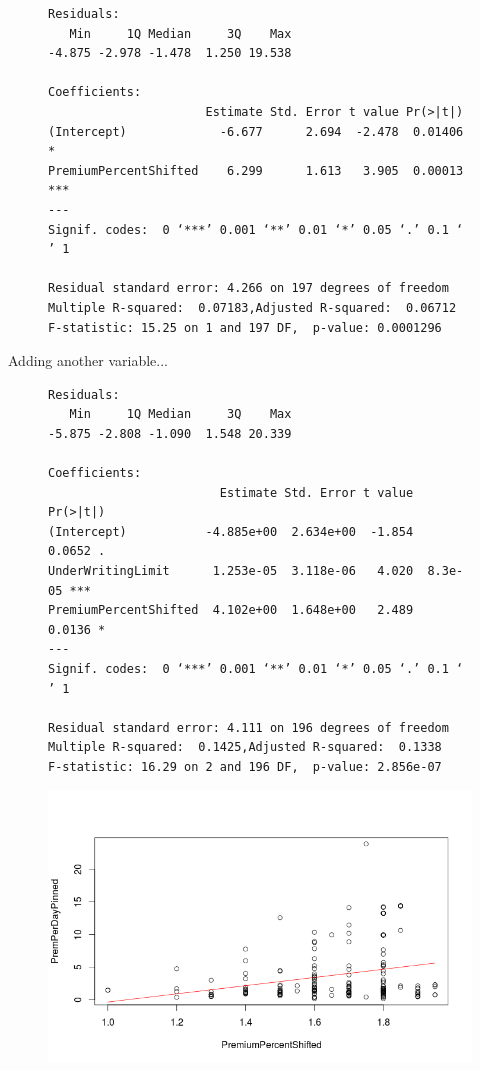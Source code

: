 \documentclass{article}
\begin{document}
\begin{figure}[H]
\centering
\begin{BVerbatim}
Residuals:
   Min     1Q Median     3Q    Max 
-4.875 -2.978 -1.478  1.250 19.538 

Coefficients:
                      Estimate Std. Error t value Pr(>|t|)    
(Intercept)             -6.677      2.694  -2.478  0.01406 *  
PremiumPercentShifted    6.299      1.613   3.905  0.00013 ***
---
Signif. codes:  0 ‘***’ 0.001 ‘**’ 0.01 ‘*’ 0.05 ‘.’ 0.1 ‘ ’ 1

Residual standard error: 4.266 on 197 degrees of freedom
Multiple R-squared:  0.07183,Adjusted R-squared:  0.06712 
F-statistic: 15.25 on 1 and 197 DF,  p-value: 0.0001296
\end{BVerbatim}
\end{figure}


Adding another variable...\\

\begin{figure}[H]
\begin{center}
\begin{BVerbatim}
Residuals:
   Min     1Q Median     3Q    Max 
-5.875 -2.808 -1.090  1.548 20.339 

Coefficients:
                        Estimate Std. Error t value Pr(>|t|)    
(Intercept)           -4.885e+00  2.634e+00  -1.854   0.0652 .  
UnderWritingLimit      1.253e-05  3.118e-06   4.020  8.3e-05 ***
PremiumPercentShifted  4.102e+00  1.648e+00   2.489   0.0136 *  
---
Signif. codes:  0 ‘***’ 0.001 ‘**’ 0.01 ‘*’ 0.05 ‘.’ 0.1 ‘ ’ 1

Residual standard error: 4.111 on 196 degrees of freedom
Multiple R-squared:  0.1425,Adjusted R-squared:  0.1338 
F-statistic: 16.29 on 2 and 196 DF,  p-value: 2.856e-07
\end{BVerbatim}
\end{center}
\end{figure}

\begin{figure}[H]
\centering
\includegraphics[width=0.45\paperwidth]{pinnedPremPerDay.png}
\end{figure}
\end{document}
